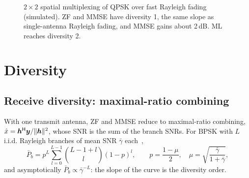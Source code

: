 \begin{figure}[htbp]
\centering
{}
\caption{$2\times2$ spatial multiplexing of QPSK over fast Rayleigh fading (simulated).
ZF and MMSE have diversity 1, the same slope as single-antenna Rayleigh fading, and MMSE gains
about 2\,dB. ML reaches diversity 2.}
\label{fig:smux}
\end{figure}

\section{Diversity}\label{sec:diversity}
\subsection{Receive diversity: maximal-ratio combining}
With one transmit antenna, ZF and MMSE reduce to maximal-ratio combining,
$\hat x=\bm{h}^{\mathsf{H}}\bm{y}/\|\bm{h}\|^2$, whose SNR is the sum of the branch SNRs. For BPSK with
$L$ i.i.d. Rayleigh branches of mean SNR $\bar\gamma$ each~\cite{proakis2008},
\begin{equation}
  \bar P_b=p^L\sum_{l=0}^{L-1}\binom{L-1+l}{l}(1-p)^l,\qquad
  p=\frac{1-\mu}{2},\quad \mu=\sqrt{\frac{\bar\gamma}{1+\bar\gamma}},
  \label{eq:mrc}
\end{equation}
and asymptotically $\bar P_b\propto\bar\gamma^{-L}$: the slope of the curve is the diversity order.

